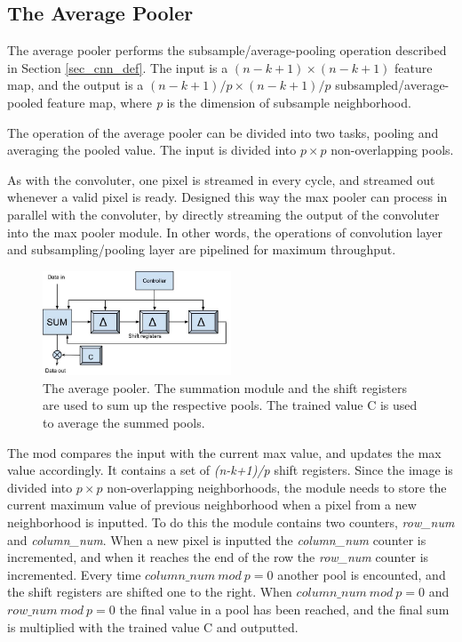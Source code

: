 \vspace*{1\baselineskip}


\subsection{The Average Pooler} \label{sec_average_pooler}

The average pooler performs the subsample/average-pooling operation described in Section \ref{sec_cnn_def}. The input is a $ (n-k+1) \times (n-k+1) $ feature map, and the output is a $ (n-k+1)/p \times (n-k+1)/p $ subsampled/average-pooled feature map, where \textit{p} is the dimension of subsample neighborhood. 

The operation of the average pooler can be divided into two tasks, pooling and averaging the pooled value. The input is divided into $ p \times p $ non-overlapping pools.  


As with the convoluter, one pixel is streamed in every cycle, and streamed out whenever a valid pixel is ready. Designed this way the max pooler can process in parallel with the convoluter, by directly streaming the output of the convoluter into the max pooler module. In other words, the operations of convolution layer and subsampling/pooling layer are pipelined for maximum throughput.

\begin{figure}[h!]
  \centering
      \includegraphics[width=0.5\textwidth]{Figures/Method/submax}
  \caption{The average pooler. The summation module and the shift registers are used to sum up the respective pools. The trained value C is used to average the summed pools.}
\end{figure}


The mod compares the input with the current max value, and updates the max value accordingly. It contains a set of \textit{(n-k+1)/p} shift registers. Since the image is divided into $ p \times p $ non-overlapping neighborhoods, the module needs to store the current maximum value of previous neighborhood when a pixel from a new neighborhood is inputted. To do this the module contains two counters, \textit{row\_num} and \textit{column\_num}. When a new pixel is inputted the \textit{column\_num} counter is incremented, and when it reaches the end of the row the \textit{row\_num} counter is incremented. Every time $ column\_num~mod~p = 0 $ another pool is encounted, and the shift registers are shifted one to the right. When $ column\_num~mod~p = 0 $ and $ row\_num~mod~p = 0 $ the final value in a pool has been reached, and the final sum is multiplied with the trained value C and outputted. 



